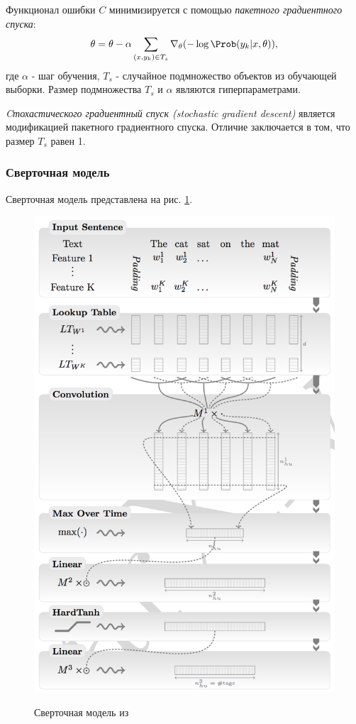   Функционал ошибки $C$ минимизируется с помощью \textit{пакетного градиентного спуска}:
  \[
    \theta = \theta - \alpha\sum_{(x, y_k) \in T_s}\nabla_{\theta}(-\log\Prob(y_k | x, \theta)),
  \]
  где $\alpha$ - шаг обучения, $T_s$ - случайное подмножество объектов из обучающей выборки.
  Размер подмножества $T_s$ и $\alpha$ являются гиперпараметрами.

  \textit{Cтохастического градиентный спуск (stochastic gradient descent)} является
  модификацией пакетного градиентного спуска. Отличие заключается в том, что размер $T_s$ равен 1.

  \subsubsection{Сверточная модель}  \label{subsubsection:conv}
  Сверточная модель представлена на рис. \ref{figure:conv_net}.
  \newpage
  \begin{figure}[!h]
    \centering
    \caption{Сверточная модель из \citep{collobert2011natural}}
    \includegraphics[scale=0.9]{figures/sentence-diagram.png}
    \label{figure:conv_net}
  \end{figure}

